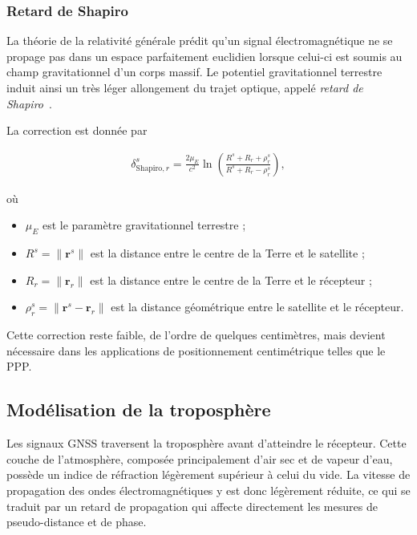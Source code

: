 \subsubsection{Retard de Shapiro}\label{shapiro}

La théorie de la relativité générale prédit qu'un signal électromagnétique ne se propage pas dans un espace parfaitement euclidien lorsque celui-ci est soumis au champ gravitationnel d'un corps massif. Le potentiel gravitationnel terrestre induit ainsi un très léger allongement du trajet optique, appelé \textit{retard de Shapiro}~\cite{ashby2003}.

La correction est donnée par

\begin{align}
\delta_{\mathrm{Shapiro},r}^s
=
\frac{2\mu_E}{c^2}
\ln
\left(
\frac{R^s+R_r+\rho_r^s}
     {R^s+R_r-\rho_r^s}
\right),
\end{align}

où

\begin{itemize}
    \item $\mu_E$ est le paramètre gravitationnel terrestre ;
    \item $R^s = \|\mathbf r^s\|$ est la distance entre le centre de la Terre et le satellite ;
    \item $R_r = \|\mathbf r_r\|$ est la distance entre le centre de la Terre et le récepteur ;
    \item $\rho_r^s = \|\mathbf r^s - \mathbf r_r\|$ est la distance géométrique entre le satellite et le récepteur.
\end{itemize}

Cette correction reste faible, de l'ordre de quelques centimètres, mais devient nécessaire dans les applications de positionnement centimétrique telles que le PPP.

\subsection{Modélisation de la troposphère}

Les signaux GNSS traversent la troposphère avant d'atteindre le récepteur.
Cette couche de l'atmosphère, composée principalement d'air sec et de vapeur
d'eau, possède un indice de réfraction légèrement supérieur à celui du vide.
La vitesse de propagation des ondes électromagnétiques y est donc légèrement
réduite, ce qui se traduit par un retard de propagation qui affecte directement
les mesures de pseudo-distance et de phase.

